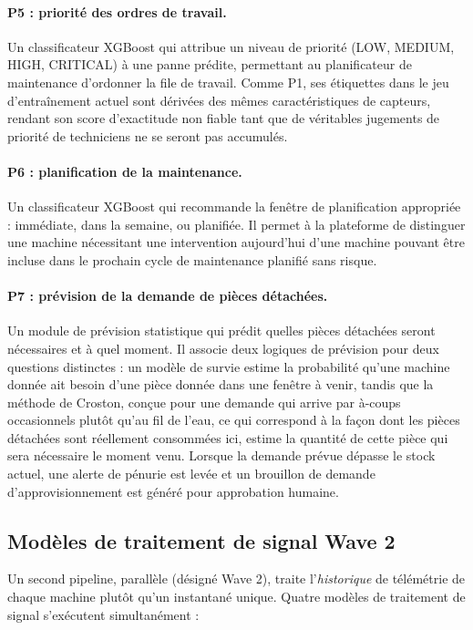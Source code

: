 \paragraph{P5 : priorité des ordres de travail.}
Un classificateur XGBoost qui attribue un niveau de priorité (LOW, MEDIUM, HIGH, CRITICAL) à une panne prédite, permettant au planificateur de maintenance d'ordonner la file de travail. Comme P1, ses étiquettes dans le jeu d'entraînement actuel sont dérivées des mêmes caractéristiques de capteurs, rendant son score d'exactitude non fiable tant que de véritables jugements de priorité de techniciens ne se seront pas accumulés.

\paragraph{P6 : planification de la maintenance.}
Un classificateur XGBoost qui recommande la fenêtre de planification appropriée : immédiate, dans la semaine, ou planifiée. Il permet à la plateforme de distinguer une machine nécessitant une intervention aujourd'hui d'une machine pouvant être incluse dans le prochain cycle de maintenance planifié sans risque.

\paragraph{P7 : prévision de la demande de pièces détachées.}
Un module de prévision statistique qui prédit quelles pièces détachées seront nécessaires et à quel moment. Il associe deux logiques de prévision pour deux questions distinctes : un modèle de survie estime la probabilité qu'une machine donnée ait besoin d'une pièce donnée dans une fenêtre à venir, tandis que la méthode de Croston, conçue pour une demande qui arrive par à-coups occasionnels plutôt qu'au fil de l'eau, ce qui correspond à la façon dont les pièces détachées sont réellement consommées ici, estime la quantité de cette pièce qui sera nécessaire le moment venu. Lorsque la demande prévue dépasse le stock actuel, une alerte de pénurie est levée et un brouillon de demande d'approvisionnement est généré pour approbation humaine.

\subsection{Modèles de traitement de signal Wave 2}

Un second pipeline, parallèle (désigné Wave 2), traite l'\emph{historique} de télémétrie de chaque machine plutôt qu'un instantané unique. Quatre modèles de traitement de signal s'exécutent simultanément :

